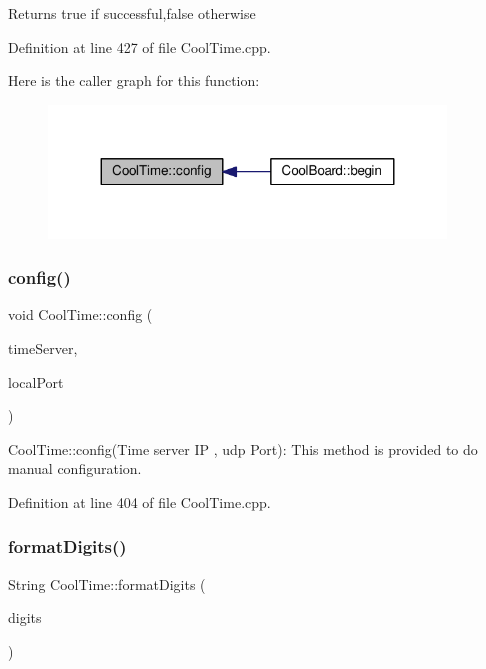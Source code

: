 \begin{DoxyReturn}{Returns}
true if successful,false otherwise 
\end{DoxyReturn}


Definition at line 427 of file Cool\+Time.\+cpp.

Here is the caller graph for this function\+:
\nopagebreak
\begin{figure}[H]
\begin{center}
\leavevmode
\includegraphics[width=299pt]{class_cool_time_a87c28260c1bc77091162cbcf1ee2e129_icgraph}
\end{center}
\end{figure}
\mbox{\label{class_cool_time_a014656d0d3f74d6391364b92b13e0780}} 
\subsubsection{\texorpdfstring{config()}{config()}\hspace{0.1cm}{\footnotesize\ttfamily [2/2]}}
{\footnotesize\ttfamily void Cool\+Time\+::config (\begin{DoxyParamCaption}\item[{I\+P\+Address}]{time\+Server,  }\item[{unsigned int}]{local\+Port }\end{DoxyParamCaption})}

Cool\+Time\+::config(\+Time server I\+P , udp Port)\+: This method is provided to do manual configuration. 

Definition at line 404 of file Cool\+Time.\+cpp.

\mbox{\label{class_cool_time_acd537cd4210d7bde4e1f5c47d2ac0456}} 
\subsubsection{\texorpdfstring{format\+Digits()}{formatDigits()}}
{\footnotesize\ttfamily String Cool\+Time\+::format\+Digits (\begin{DoxyParamCaption}\item[{int}]{digits }\end{DoxyParamCaption})}

